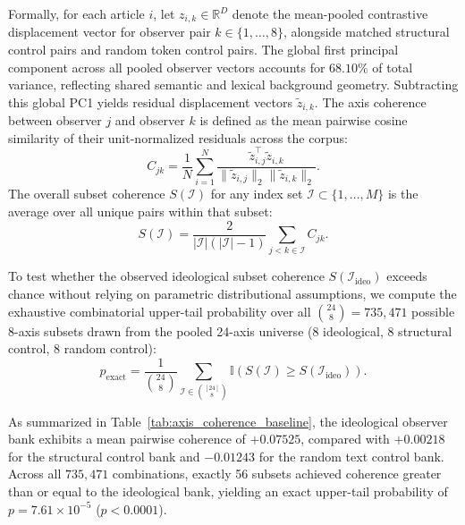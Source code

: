 Formally, for each article $i$, let $z_{i,k} \in \mathbb{R}^D$ denote the mean-pooled contrastive displacement vector for observer pair $k \in \{1,\ldots,8\}$, alongside matched structural control pairs and random token control pairs. The global first principal component across all pooled observer vectors accounts for $68.10\%$ of total variance, reflecting shared semantic and lexical background geometry. Subtracting this global PC1 yields residual displacement vectors $\tilde{z}_{i,k}$. The axis coherence between observer $j$ and observer $k$ is defined as the mean pairwise cosine similarity of their unit-normalized residuals across the corpus:
\begin{equation}
    C_{jk} = \frac{1}{N} \sum_{i=1}^N \frac{\tilde{z}_{i,j}^\top \tilde{z}_{i,k}}{\|\tilde{z}_{i,j}\|_2 \|\tilde{z}_{i,k}\|_2}.
\end{equation}
The overall subset coherence $S(\mathcal{I})$ for any index set $\mathcal{I} \subset \{1,\ldots,M\}$ is the average over all unique pairs within that subset:
\begin{equation}
    S(\mathcal{I}) = \frac{2}{|\mathcal{I}|(|\mathcal{I}|-1)} \sum_{j < k \in \mathcal{I}} C_{jk}.
\end{equation}

To test whether the observed ideological subset coherence $S(\mathcal{I}_{\text{ideo}})$ exceeds chance without relying on parametric distributional assumptions, we compute the exhaustive combinatorial upper-tail probability over all $\binom{24}{8} = 735{,}471$ possible 8-axis subsets drawn from the pooled 24-axis universe (8 ideological, 8 structural control, 8 random control):
\begin{equation}
    p_{\text{exact}} = \frac{1}{\binom{24}{8}} \sum_{\mathcal{I} \in \binom{[24]}{8}} \mathbb{I}\left(S(\mathcal{I}) \geq S(\mathcal{I}_{\text{ideo}})\right).
\end{equation}

As summarized in Table~\ref{tab:axis_coherence_baseline}, the ideological observer bank exhibits a mean pairwise coherence of $+0.07525$, compared with $+0.00218$ for the structural control bank and $-0.01243$ for the random text control bank. Across all $735{,}471$ combinations, exactly 56 subsets achieved coherence greater than or equal to the ideological bank, yielding an exact upper-tail probability of $p = 7.61 \times 10^{-5}$ ($p < 0.0001$).

